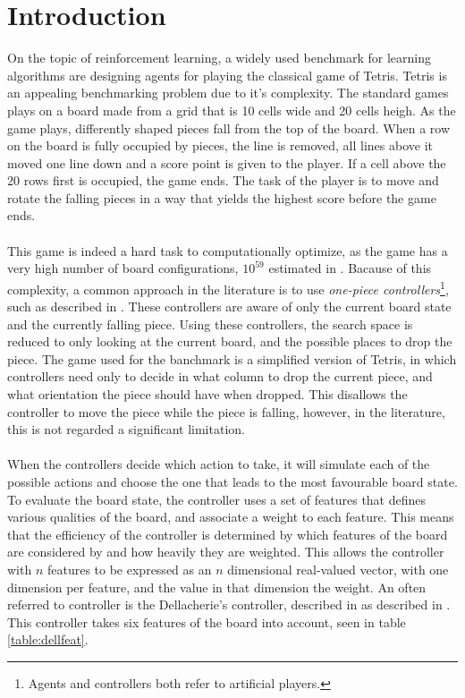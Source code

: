 \section{Introduction \label{sec:intro}}

On the topic of reinforcement learning, a widely used benchmark
for learning algorithms are designing agents 
for playing the classical game of Tetris. Tetris is an 
appealing benchmarking problem due to it's complexity. The 
standard games plays on a board made from a grid that is
10 cells wide and 20 cells heigh. As the game plays, differently
shaped pieces fall from the top of the board. 
When a row on the board is fully occupied by pieces, the line
is removed, all lines above it moved one line down and a score
point is given to the player. If a cell above the 20 rows first is
occupied, the game ends. The task of the player is to move
and rotate the falling pieces in a way that yields the highest 
score before the game ends.\\
\\
This game is indeed a hard task to computationally optimize, as
the game has a very high number of board configurations, 
$10^{59}$ estimated in \cite{scherrer2009}. Bacause of this
complexity, a common approach 
in the literature is to use 
\textit{one-piece controllers}\footnote{Agents and controllers
both refer to artificial players.}, such as described in 
\cite{scherrer2009:b}. These controllers are aware of only 
the current board state and the currently falling piece.
Using these controllers, the search space is reduced 
to only looking at the current board, and the possible 
places to drop the piece. The 
game used for the banchmark is a simplified version of Tetris,
in which 
controllers need only to decide in what column to drop the current
piece, and what orientation the piece should have when dropped.
This disallows the controller to move the piece while 
the piece is falling, however, in the literature, this 
is not regarded a significant limitation.\\
\\
When the controllers decide which action to take, it will
simulate each of the possible actions and choose the one that
leads to the most favourable board state. To evaluate the board 
state, the controller uses a set of features that defines 
various qualities of the board, and associate a weight to each 
feature. This means that the efficiency of the controller 
is determined by which features of the board are considered by
and how heavily they are weighted. This allows
the controller with $n$ features to be expressed as an 
$n$ dimensional real-valued vector, with one dimension 
per feature, and the value in that dimension the weight.
An often referred to controller is the Dellacherie's controller,
described in as described in \cite{scherrer2009}. This controller
takes six features of the board into account, seen in table 
\ref{table:dellfeat}.

